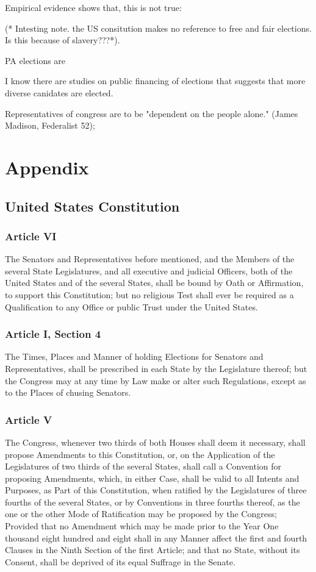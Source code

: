 \documentclass[11pt]{article} %
\begin{document}
\begin{enumerate}
Empirical evidence shows that, this is not true:  

(* Intesting note.  the US consitution makes no reference to free and fair elections. Is this because of slavery???*). 

PA elections are 

I know there are studies on public financing of elections that suggests that more diverse canidates are elected. 

Representatives of congress are to be "dependent on the people alone." (James Madison, Federalist 52); 

\section{Appendix}
\subsection{United States Constitution}

\subsubsection{Article VI}
\label{sec:ArticleVIUS}
The Senators and Representatives before mentioned, and the Members of the several State Legislatures, and all executive and judicial Officers, both of the United States and of the several States, shall be bound by Oath or Affirmation, to support this Constitution; but no religious Test shall ever be required as a Qualification to any Office or public Trust under the United States.

\subsubsection{Article I, Section 4}
\label{sec:ArticleISection4US}
The Times, Places and Manner of holding Elections for Senators and Representatives, shall be prescribed in each State by the Legislature thereof; but the Congress may at any time by Law make or alter such Regulations, except as to the Places of chusing Senators. 

\subsubsection{Article V}
\label{sec:ArticleVUS}
 The Congress, whenever two thirds of both Houses shall deem it necessary, shall propose Amendments to this Constitution, or, on the Application of the Legislatures of two thirds of the several States, shall call a Convention for proposing Amendments, which, in either Case, shall be valid to all Intents and Purposes, as Part of this Constitution, when ratified by the Legislatures of three fourths of the several States, or by Conventions in three fourths thereof, as the one or the other Mode of Ratification may be proposed by the Congress; Provided that no Amendment which may be made prior to the Year One thousand eight hundred and eight shall in any Manner affect the first and fourth Clauses in the Ninth Section of the first Article; and that no State, without its Consent, shall be deprived of its equal Suffrage in the Senate. 


\end{enumerate}
\end{document}
